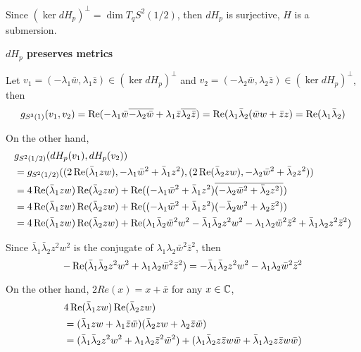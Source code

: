 \begin{longproof}
	Since $(\ker dH_p)^\perp = \dim T_q S^2(1/2)$, then $dH_p$ is surjective, $H$ is a submersion.
	
	\textbf{$dH_p$ preserves metrics}
	
	Let $v_1 = ( - \lambda_1 \bar{w}, \lambda_1 \bar{z}) \in (\ker dH_p)^\perp$ and $v_2 = ( - \lambda_2 \bar{w}, \lambda_2 \bar{z}) \in (\ker dH_p)^\perp$, then 
	$$
		g_{S^3(1)}(v_1, v_2) = \operatorname{Re}(- \lambda_1 \bar{w} \overline{- \lambda_2 \bar{w}} + \lambda_1 \bar{z} \overline{\lambda_2 \bar{z}}) = \operatorname{Re}(\lambda_1 \bar{\lambda}_2 (\bar{w} w + \bar{z} z) = \operatorname{Re}(\lambda_1 \bar{\lambda}_2)
	$$
	
	On the other hand, 
	\begin{align*}
		&g_{S^2(1/2)}(dH_p(v_1), dH_p(v_2)) \\ 
		&= g_{S^2(1/2)}((2 \operatorname{Re}(\bar{\lambda}_1 z w), -\lambda_1 \bar{w}^2 + \bar{\lambda}_1 z^2 ), (2 \operatorname{Re}(\bar{\lambda}_2 z w), -\lambda_2 \bar{w}^2 + \bar{\lambda}_2 z^2 )) \\
		&= 4 \operatorname{Re}(\bar{\lambda}_1 z w) \operatorname{Re}(\bar{\lambda}_2 z w) + \operatorname{Re}((-\lambda_1 \bar{w}^2 + \bar{\lambda}_1 z^2) \overline{(-\lambda_2 \bar{w}^2 + \bar{\lambda}_2 z^2)}) \\
		&= 4 \operatorname{Re}(\bar{\lambda}_1 z w) \operatorname{Re}(\bar{\lambda}_2 z w) + \operatorname{Re}((-\lambda_1 \bar{w}^2 + \bar{\lambda}_1 z^2) (-\bar{\lambda}_2 w^2 + \lambda_2 \bar{z}^2)) \\
		&= 4 \operatorname{Re}(\bar{\lambda}_1 z w) \operatorname{Re}(\bar{\lambda}_2 z w) + \operatorname{Re}(\lambda_1 \bar{\lambda}_2 \bar{w}^2 w^2 - \bar{\lambda}_1 \bar{\lambda}_2 z^2 w^2 - \lambda_1 \lambda_2 \bar{w}^2 \bar{z}^2 + \bar{\lambda}_1 \lambda_2 z^2 \bar{z}^2 ) 
	\end{align*}
	
	Since $\bar{\lambda}_1 \bar{\lambda}_2 z^2 w^2$ is the conjugate of $\lambda_1 \lambda_2 \bar{w}^2 \bar{z}^2$, then 
	$$
		- \operatorname{Re}(\bar{\lambda}_1 \bar{\lambda}_2 z^2 w^2 + \lambda_1 \lambda_2 \bar{w}^2 \bar{z}^2) = - \bar{\lambda}_1 \bar{\lambda}_2 z^2 w^2 - \lambda_1 \lambda_2 \bar{w}^2 \bar{z}^2
	$$
	
	On the other hand, $2 Re(x) = x + \bar{x}$ for any $x \in \mathbb{C}$,
	\begin{align*}
		&4 \operatorname{Re}(\bar{\lambda}_1 z w) \operatorname{Re}(\bar{\lambda}_2 z w) \\
		&= (\bar{\lambda}_1 z w + \lambda_1 \bar{z} \bar{w})(\bar{\lambda}_2 z w + \lambda_2 \bar{z} \bar{w}) \\
		&= (\bar{\lambda}_1 \bar{\lambda}_2 z^2 w^2 + \lambda_1 \lambda_2 \bar{z}^2 \bar{w}^2) + (\lambda_1 \bar{\lambda}_2 z \bar{z} w \bar{w} + \bar{\lambda}_1 \lambda_2 z \bar{z} w \bar{w})
	\end{align*}
	

\end{longproof}

